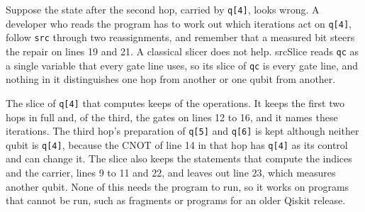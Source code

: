 Suppose the state after the second hop, carried by \texttt{q[4]}, looks wrong. A developer who reads the program has to
work out which iterations act on \texttt{q[4]}, follow \texttt{src} through two reassignments, and remember that a
measured bit steers the repair on lines 19 and 21. A classical slicer does not help. srcSlice reads \texttt{qc} as a
single variable that every gate line uses, so its slice of \texttt{qc} is every gate line, and nothing in it
distinguishes one hop from another or one qubit from another.

The slice of \texttt{q[4]} that \tool{} computes keeps \numExSliceOps{} of the \numExAllOps{} operations. It
keeps the first two hops in full and, of the third, the gates on lines 12 to 16, and it names these iterations. The
third hop's preparation of \texttt{q[5]} and \texttt{q[6]} is kept although neither qubit is \texttt{q[4]}, because the
CNOT of line 14 in that hop has \texttt{q[4]} as its control and can change it. The slice also keeps the statements
that compute the indices and the carrier, lines 9 to 11 and 22, and leaves out line 23, which measures another qubit.
None of this needs the program to run, so it works on programs that cannot be run, such as fragments or programs for
an older Qiskit release.
